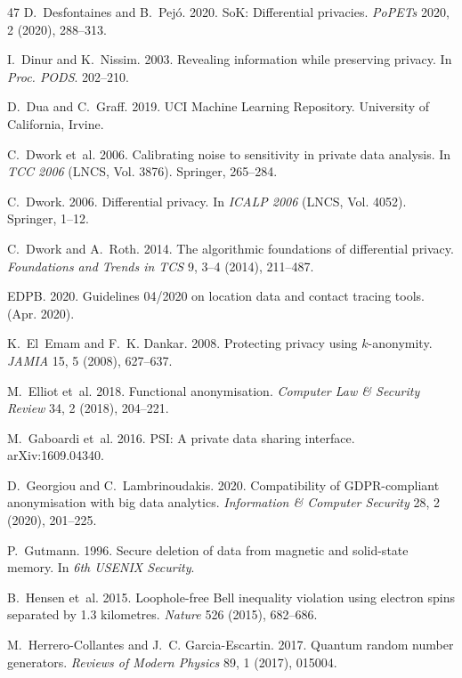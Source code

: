 \documentclass[acmsmall,screen,review,anonymous]{acmart}
\begin{document}
\begin{thebibliography}{47}
D.~Desfontaines and B.~Pej\'{o}. 2020. SoK: Differential privacies. \emph{PoPETs} 2020, 2 (2020), 288--313.

I.~Dinur and K.~Nissim. 2003. Revealing information while preserving privacy. In \emph{Proc. PODS}. 202--210.

D.~Dua and C.~Graff. 2019. UCI Machine Learning Repository. University of California, Irvine.

C.~Dwork et~al. 2006. Calibrating noise to sensitivity in private data analysis. In \emph{TCC 2006} (LNCS, Vol. 3876). Springer, 265--284.

C.~Dwork. 2006. Differential privacy. In \emph{ICALP 2006} (LNCS, Vol. 4052). Springer, 1--12.

C.~Dwork and A.~Roth. 2014. The algorithmic foundations of differential privacy. \emph{Foundations and Trends in TCS} 9, 3--4 (2014), 211--487.

{EDPB}. 2020. Guidelines 04/2020 on location data and contact tracing tools. (Apr. 2020).

K.~El~Emam and F.~K. Dankar. 2008. Protecting privacy using $k$-anonymity. \emph{JAMIA} 15, 5 (2008), 627--637.

M.~Elliot et~al. 2018. Functional anonymisation. \emph{Computer Law \& Security Review} 34, 2 (2018), 204--221.

M.~Gaboardi et~al. 2016. PSI: A private data sharing interface. arXiv:1609.04340.

D.~Georgiou and C.~Lambrinoudakis. 2020. Compatibility of GDPR-compliant anonymisation with big data analytics. \emph{Information \& Computer Security} 28, 2 (2020), 201--225.

P.~Gutmann. 1996. Secure deletion of data from magnetic and solid-state memory. In \emph{6th USENIX Security}.

B.~Hensen et~al. 2015. Loophole-free Bell inequality violation using electron spins separated by 1.3 kilometres. \emph{Nature} 526 (2015), 682--686.

M.~Herrero-Collantes and J.~C. Garcia-Escartin. 2017. Quantum random number generators. \emph{Reviews of Modern Physics} 89, 1 (2017), 015004.


\end{thebibliography}
\end{document}
